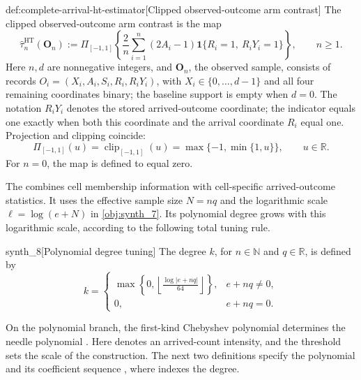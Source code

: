 \documentclass[11pt]{article}
\begin{document}
\begin{definitionv}{def:complete-arrival-ht-estimator}[Clipped observed-outcome arm contrast]
The clipped observed-outcome arm contrast is the map
\[
\widehat\tau^{\mathrm{HT}}_n(\mathbf O_n)
:=
\Pi_{[-1,1]}\!\left\{
\frac{2}{n}\sum_{i=1}^n
(2A_i-1)\mathbf{1}\{R_i=1,\ R_iY_i=1\}
\right\},
\qquad n\ge1.
\]
Here \(n,d\) are nonnegative integers, and \(\mathbf O_n\), the observed sample, consists of records
\(O_i=(X_i,A_i,S_i,R_i,R_iY_i)\), with \(X_i\in\{0,\ldots,d-1\}\) and all four remaining coordinates binary; the baseline support is empty when \(d=0\). The notation \(R_iY_i\) denotes the stored arrived-outcome coordinate; the indicator equals one exactly when both this coordinate and the arrival coordinate \(R_i\) equal one. Projection and clipping coincide:
\[
\Pi_{[-1,1]}(u)=\operatorname{clip}_{[-1,1]}(u)
=\max\{-1,\min\{1,u\}\},
\qquad u\in\mathbb R.
\]
For \(n=0\), the map is defined to equal zero.
\end{definitionv}

The  combines cell membership information with cell-specific arrived-outcome statistics. It uses the effective sample size \(N=nq\) and the logarithmic scale \(\ell=\log(e+N)\) in \cref{obj:synth_7}. Its polynomial degree  grows with this logarithmic scale, according to the following total tuning rule.

\begin{definitionv}{synth_8}[Polynomial degree tuning]
The degree \(k\), for \(n\in\mathbb N\) and \(q\in\mathbb R\), is defined by
\[
k=
\begin{cases}
\displaystyle \max\left\{0,\left\lfloor\frac{\log|e+nq|}{64}\right\rfloor\right\},
& e+nq\ne 0,\\
0, & e+nq=0.
\end{cases}
\]
\end{definitionv}

On the polynomial branch, the first-kind Chebyshev polynomial  determines the needle polynomial . Here  denotes an arrived-count intensity, and the threshold  sets the scale of the construction. The next two definitions specify the polynomial and its coefficient sequence , where  indexes the degree.
\end{document}
